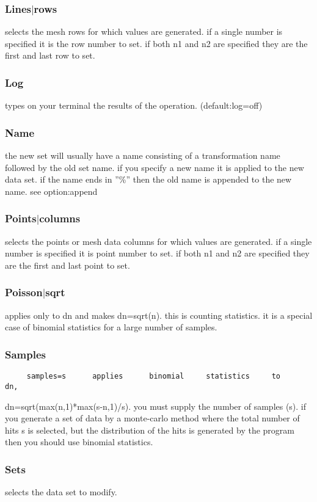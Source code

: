 \subsubsection{Lines$|$rows}
selects  the  mesh  rows  for  which values are generated.  if a single
number is specified it is the row number to set.  if both n1 and n2 are
specified they are the first and last row to set.  
\subsubsection{Log}
types on your terminal the results of the operation.  (default:log=off) 
\subsubsection{Name}
the  new  set  will  usually have a name consisting of a transformation
name followed by the old set name.  if you specify a  new  name  it  is
applied to the new data set.  if the name ends in ''\%'' then the old name
is appended to the new name.  see option:append 
\subsubsection{Points$|$columns}
selects the points or mesh data columns for which values are generated.
if a single number is specified it is point number to set.  if both  n1
and n2 are specified they are the first and last point to set.  
\subsubsection{Poisson$|$sqrt}
applies  only to dn and makes dn=sqrt(n).  this is counting statistics.
it is a special case of binomial  statistics  for  a  large  number  of
samples.  
\subsubsection{Samples}
\begin{verbatim}
     samples=s      applies      binomial     statistics     to     dn,
\end{verbatim}
dn=sqrt(max(n,1)*max(s-n,1)/s).  you must supply the number of  samples
(s).   if  you generate a set of data by a monte-carlo method where the
total number of hits s is selected, but the distribution of the hits is
generated by the program then you should use binomial statistics.  
\subsubsection{Sets}
selects the data set to modify.  

